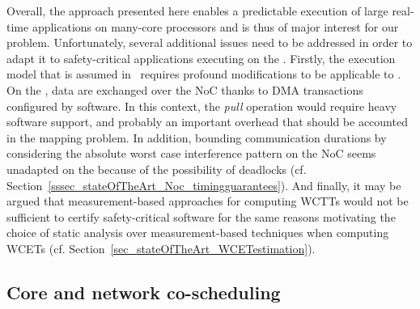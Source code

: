 \documentclass[main.tex]{subfiles}
\begin{document}
Overall, the approach presented here enables a predictable execution of large real-time applications on many-core processors and is thus of major interest for our problem. Unfortunately, several additional issues need to be addressed in order to adapt it to safety-critical applications executing on the \mppalong. Firstly, the execution model that is assumed in~\cite{PuffitschNP15} requires profound modifications to be applicable to \mppalong. On the \mppalong, data are exchanged over the NoC thanks to DMA transactions configured by software. In this context, the \emph{pull} operation would require heavy software support, and probably an important overhead that should be accounted in the mapping problem. In addition, bounding communication durations by considering the absolute worst case interference pattern on the NoC seems unadapted on the \mppalong because of the possibility of deadlocks (cf. Section~\ref{sssec_stateOfTheArt_Noc_timingguarantees}). And finally, it may be argued that measurement-based approaches for computing WCTTs would not be sufficient to certify safety-critical software for the same reasons motivating the choice of static analysis over measurement-based techniques when computing WCETs (cf. Section~\ref{sec_stateOfTheArt_WCETestimation}).


\subsection{Core and network co-scheduling}
\end{document}
